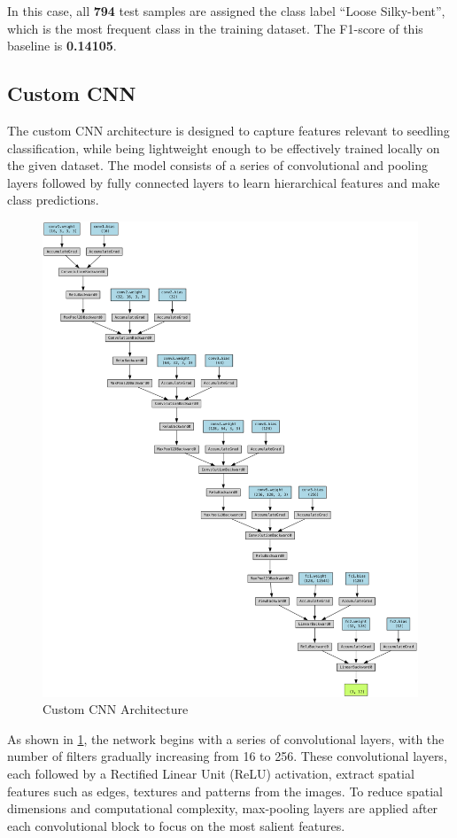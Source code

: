 In this case, all \textbf{794} test samples are assigned the class label ``Loose Silky-bent'', which is the most frequent class in the training dataset. The F1-score of this baseline is \textbf{0.14105}.

\subsection{Custom CNN}

The custom CNN architecture is designed to capture features relevant to seedling classification, while being lightweight enough to be effectively trained locally on the given dataset. The model consists of a series of convolutional and pooling layers followed by fully connected layers to learn hierarchical features and make class predictions.

\begin{figure}[htbp]
    \centerline{\includegraphics[width=0.9\linewidth]{../../resources/custom_cnn/architecture.png}}
    \caption{Custom CNN Architecture}
    \label{fig:custom-cnn-architecture}
\end{figure}

As shown in \ref{fig:custom-cnn-architecture}, the network begins with a series of convolutional layers, with the number of filters gradually increasing from 16 to 256. These convolutional layers, each followed by a Rectified Linear Unit (ReLU) activation, extract spatial features such as edges, textures and patterns from the images. To reduce spatial dimensions and computational complexity, max-pooling layers are applied after each convolutional block to focus on the most salient features.

